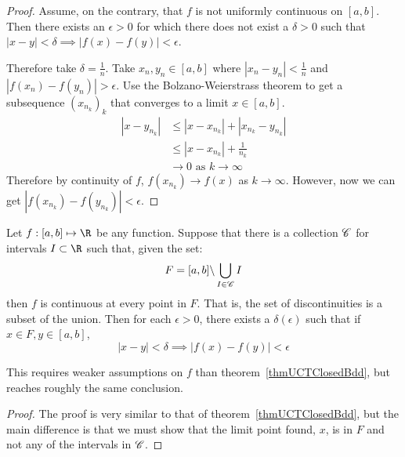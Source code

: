 \documentclass[../Main.tex]{subfiles}
\begin{document}
\begin{proof}
    Assume, on the contrary, that $f$ is not uniformly continuous on $[a, b]$. Then there exists an $\epsilon > 0$ for which there does not exist a $\delta > 0$ such that $|x - y| < \delta \implies |f(x) - f(y)| < \epsilon$. 

    Therefore take $\delta = \frac{1}{n}$. Take $x_n, y_n \in [a, b]$ where $|x_n - y_n| < \frac{1}{n}$ and $|f(x_n) - f(y_n)| > \epsilon$. Use the Bolzano-Weierstrass theorem to get a subsequence $(x_{n_k})_k$ that converges to a limit $x \in [a, b]$.
    \begin{align*}
        |x-y_{n_k}| &\leq |x-x_{n_k}| + |x_{n_k} - y_{n_k}| \\
        &\leq |x - x_{n_k}| + \frac{1}{n_k} \\
        &\to 0 \text{ as } k \to \infty
    \end{align*}
    Therefore by continuity of $f$, $f(x_{n_k}) \to f(x)$ as $k \to \infty$. However, now we can get $|f(x_{n_k}) - f(y_{n_k})| < \epsilon$.\contradiction
\end{proof}
\begin{theorem}
    Let $f : [a, b] \mapsto \R$ be any function. Suppose that there is a collection $\mathscr{C}$ for intervals $I \subset \R$ such that, given the set:
    \begin{equation*}
        F = [a, b] \backslash \bigcup_{I \in \mathscr{C}} I
    \end{equation*}
    then $f$ is continuous at every point in $F$. That is, the set of discontinuities is a subset of the union. Then for each $\epsilon > 0$, there exists a $\delta(\epsilon)$ such that if $x \in F, y \in [a, b]$,
    \begin{equation*}
        |x - y| < \delta \implies |f(x) - f(y)| < \epsilon
    \end{equation*}
    \label{thmUCTSubsetClosedBdd}
\end{theorem}
\begin{remark}
    This requires weaker assumptions on $f$ than theorem~\ref{thmUCTClosedBdd}, but reaches roughly the same conclusion.
\end{remark}
\begin{proof}
    The proof is very similar to that of theorem~\ref{thmUCTClosedBdd}, but the main difference is that we must show that the limit point found, $x$, is in $F$ and not any of the intervals in $\mathscr{C}$.
\end{proof}
\end{document}
